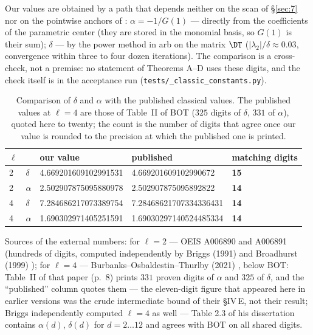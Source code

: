 Our values are obtained by a path that depends neither on the scan of \S\ref{sec:7} nor on the pointwise anchors of : $\alpha = -1/G(1)$ --- directly from the coefficients of the parametric center (they are stored in the monomial basis, so $G(1)$ is their sum); $\delta$ --- by the power method in arb on the matrix $\DT$ ($|\lambda_{2}|/\delta \approx 0.03$, convergence within three to four dozen iterations). The comparison is a cross-check, not a premise: no statement of Theorems A--D uses these digits, and the check itself is in the acceptance run (\texttt{tests/\allowbreak \_\allowbreak classic\_\allowbreak constants.py}).

\begin{table}[h]
\centering
\caption{Comparison of $\delta$ and $\alpha$ with the published classical values.
The published values at $\ell = 4$ are those of Table~II of BOT ($325$ digits of $\delta$, $331$ of $\alpha$), quoted here to twenty; the count is the
number of digits that agree once our value is rounded to the precision at which
the published one is printed.}\label{tab:3.9-classic}
\begin{tabular}{lllll}
\toprule
$\ell$ & & our value & published & matching digits \\
\midrule
2 & $\delta$ & 4.669201609102991531 & 4.669201609102990672 & \textbf{15} \\
2 & $\alpha$ & 2.502907875095880978 & 2.502907875095892822 & \textbf{14} \\
4 & $\delta$ & 7.284686217073389754 & 7.28468621707334336431 & \textbf{14} \\
4 & $\alpha$ & 1.690302971405251591 & 1.69030297140524485334 & \textbf{14} \\
\bottomrule
\end{tabular}
\end{table}

Sources of the external numbers: for $\ell = 2$ --- OEIS A006890 and A006891 \cite{oeisA006890, oeisA006891} (hundreds of digits, computed independently by Briggs (1991) \cite{briggs1991precise} and Broadhurst (1999) \cite{broadhurst1999feigenbaum}); for $\ell = 4$ --- Burbanks--Osbaldestin--Thurlby (2021) \cite{burbanks2021rigorous}, below BOT: Table~II of that paper (p.~8) prints $331$ proven digits of $\alpha$ and $325$ of $\delta$, and the ``published'' column quotes them --- the eleven-digit figure that appeared here in earlier versions was the crude intermediate bound of their \S IV\,E, not their result; Briggs independently computed $\ell = 4$ as well --- Table 2.3 of his dissertation \cite{briggs1997thesis} contains $\alpha(d)$, $\delta(d)$ for $d = 2\ldots 12$ and agrees with BOT on all shared digits.

